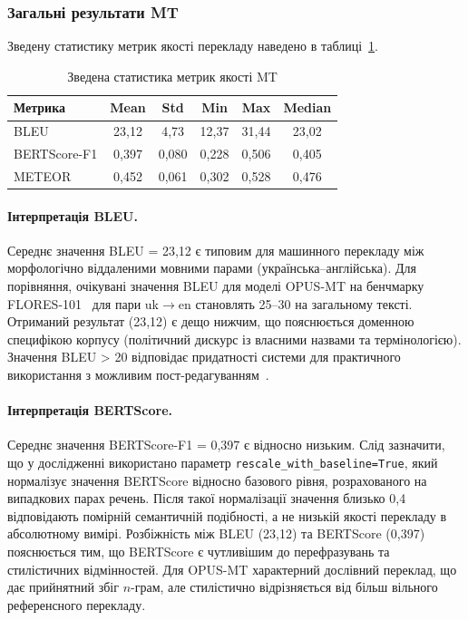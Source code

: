 \subsubsection{Загальні результати MT}

Зведену статистику метрик якості перекладу наведено в таблиці~\ref{tab:mt_summary}.

\begin{table}[h]
\centering
\caption{Зведена статистика метрик якості MT}
\label{tab:mt_summary}
\begin{tabular}{|l|c|c|c|c|c|}
\hline
\textbf{Метрика} & \textbf{Mean} & \textbf{Std} & \textbf{Min} & \textbf{Max} & \textbf{Median} \\
\hline
BLEU & 23,12 & 4,73 & 12,37 & 31,44 & 23,02 \\
BERTScore-F1 & 0,397 & 0,080 & 0,228 & 0,506 & 0,405 \\
METEOR & 0,452 & 0,061 & 0,302 & 0,528 & 0,476 \\
\hline
\end{tabular}
\end{table}

\paragraph{Інтерпретація BLEU.}
Середнє значення BLEU = 23,12 є типовим для машинного перекладу між
морфологічно віддаленими мовними парами (українська--англійська).
Для порівняння, очікувані значення BLEU для моделі OPUS-MT на бенчмарку
FLORES-101~\cite{flores} для пари uk$\to$en становлять 25--30 на
загальному тексті. Отриманий результат (23,12) є дещо нижчим, що
пояснюється доменною специфікою корпусу (політичний дискурс із
власними назвами та термінологією). Значення BLEU > 20 відповідає
придатності системи для практичного використання з можливим
пост-редагуванням~\cite{post_bleu}.

\paragraph{Інтерпретація BERTScore.}
Середнє значення BERTScore-F1 = 0,397 є відносно низьким. Слід зазначити,
що у дослідженні використано параметр \texttt{rescale\_with\_baseline=True},
який нормалізує значення BERTScore відносно базового рівня, розрахованого
на випадкових парах речень. Після такої нормалізації значення близько 0,4
відповідають помірній семантичній подібності, а не низькій якості перекладу
в абсолютному вимірі. Розбіжність між BLEU (23,12) та BERTScore (0,397)
пояснюється тим, що BERTScore є чутливішим до перефразувань та
стилістичних відмінностей. Для OPUS-MT характерний дослівний переклад,
що дає прийнятний збіг $n$-грам, але стилістично відрізняється
від більш вільного референсного перекладу.

